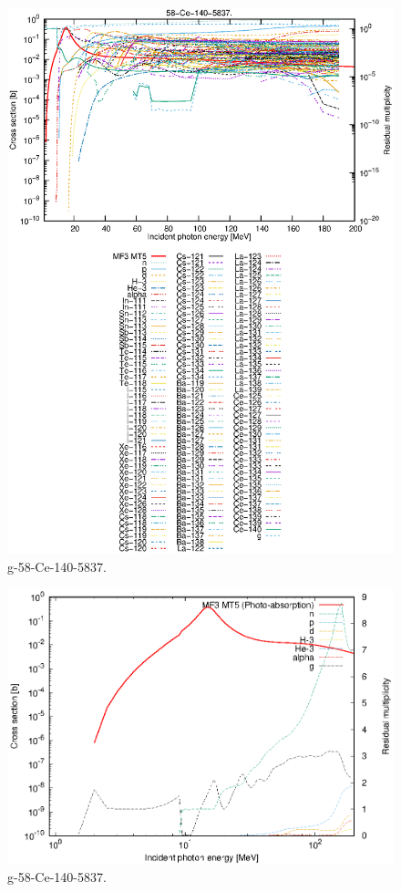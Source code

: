 \begin{figure}
 \includegraphics[width=\linewidth]{eps/g_58-Ce-140_5837.eps}
  \caption{g-58-Ce-140-5837.}
\end{figure}
\newpage \clearpage

\begin{figure}
 \includegraphics[width=\linewidth]{eps-log/g_58-Ce-140_5837.eps}
 \caption{g-58-Ce-140-5837.}
\end{figure}
\newpage \clearpage

